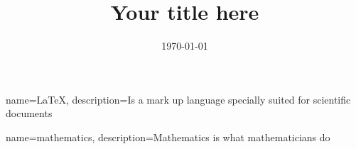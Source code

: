 \title{Your title here}
\def\metropoliadegree {Bachelor of Engineering} %
\def\metropoliadegreeprogramme {your degree programme (e.g. Information Technology)}
\def\metropoliaspecialisation {your major option (e.g. Mobile Solutions)}
\def\metropoliainstructors {
First name Last name, Title (for example: Project Manager)\newline
First name Last name, Title (for example: Principal Lecturer)
}
\def\metropoliakeywords {Keywords}
\date{\longmonth\today}




\makeglossaries


{
    name=\LaTeX{},
    description={Is a mark up language specially suited for scientific documents}
}
 
{
    name=mathematics,
    description={Mathematics is what mathematicians do}
}

